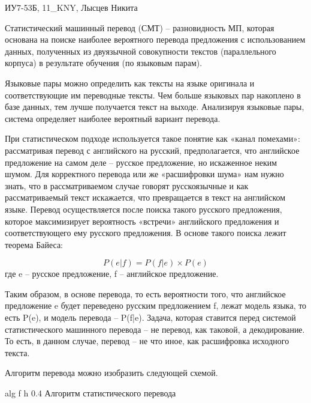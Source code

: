 \documentclass{bmstu}
\begin{document}
	ИУ7-53Б, 11\_KNY, Лысцев Никита
	
	Статистический машинный перевод (СМТ) -- разновидность МП, которая основана на поиске наиболее вероятного перевода предложения с использованием данных, полученных из двуязычной совокупности текстов (параллельного корпуса) в результате  обучения (по языковым парам)\cite{smt}.
	
	Языковые пары можно определить как тексты на языке оригинала и соответствующие им переводные тексты. Чем больше языковых пар накоплено в базе данных, тем лучше получается текст на выходе. Анализируя языковые пары, система определяет наиболее вероятный вариант перевода.
	
	При статистическом подходе используется такое понятие как «канал   помехами»\cite{smt}: рассматривая перевод с английского на русский, предполагается, что английское предложение на самом деле – русское предложение, но искаженное неким шумом. Для корректного перевода или же «расшифровки шума» нам нужно знать, что в рассматриваемом случае говорят русскоязычные и как рассматриваемый текст искажается, что превращается в текст на английском языке. Перевод осуществляется после поиска такого русского предложения, которое максимизирует вероятность «встречи» английского предложения и соответствующего ему русского предложения. В основе такого поиска лежит теорема Байеса:
	
	\begin{equation}
		\label{eq:L}
		P(e|f) = P(f|e) \times P(e)
	\end{equation}
	где e – русское предложение, f – английское предложение.
	
	Таким образом, в основе перевода, то есть вероятности того, что
	английское предложение e будет переведено русским предложением f, лежат
	модель языка, то есть P(e), и модель перевода – P(f|e). Задача, которая
	ставится перед системой статистического машинного перевода – не перевод,
	как таковой, а декодирование. То есть, в данном случае, перевод – не что
	иное, как расшифровка исходного текста. 
	
	Алгоритм перевода можно изобразить следующей схемой.
	
	{alg} %
	{f} %
	{h} %
	{0.4\textwidth} %
	{Алгоритм статистического перевода \cite{smt2}} %

	
	\clearpage
	
\end{document}
